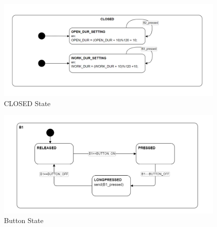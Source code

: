 \documentclass[12pt]{article}
\begin{document}
\begin{figure}[h] %
    \centering %
    \includegraphics[width=1\textwidth]{state_diagram1.png} %
    \caption{CLOSED State} %
    \label{fig:CLOSED State} %
\end{figure}

\begin{figure}[h] %
    \centering %
    \includegraphics[width=1\textwidth]{state_diagram2.png} %
    \caption{Button State} %
    \label{fig:Button State} %
\end{figure}
\newpage
{}
\listoffigures
\end{document}
